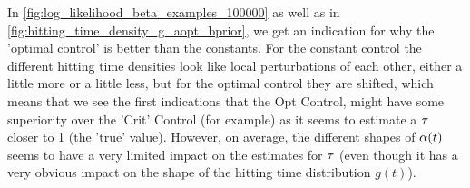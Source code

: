 \documentclass{article}
\begin{document}
In \cref{fig:log_likelihood_beta_examples_100000} as well as in 
\cref{fig:hitting_time_density_g_aopt_bprior}, we get an indication for why
the 'optimal control' is better than the constants. For the constant control
the different hitting time densities look like local perturbations of each
other, either a little more or a little less, but for the optimal control they
are shifted, which means that we see the first indications that the Opt Control,
might have some superiority over the 'Crit' Control (for example) as it seems to estimate a ${ \tau }$ closer to 1 (the 'true' value). However, on average, the different shapes of ${\alpha}(t)$ seems to have a very limited impact on the estimates for ${ \tau }$ (even though it has a very obvious impact on the shape of the hitting time distribution $g(t)$).


% 
% 
\end{document}
